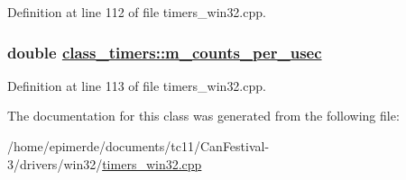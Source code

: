 Definition at line 112 of file timers\_\-win32.cpp.\hypertarget{classclass__timers_5bf844fdbe2e70ab6e3e832f688d382b}{
\subsubsection[m\_\-counts\_\-per\_\-usec]{\setlength{\rightskip}{0pt plus 5cm}double \hyperlink{classclass__timers_5bf844fdbe2e70ab6e3e832f688d382b}{class\_\-timers::m\_\-counts\_\-per\_\-usec}}}
\label{classclass__timers_5bf844fdbe2e70ab6e3e832f688d382b}




Definition at line 113 of file timers\_\-win32.cpp.

The documentation for this class was generated from the following file:\begin{CompactItemize}
\item 
/home/epimerde/documents/tc11/Can\-Festival-3/drivers/win32/\hyperlink{timers__win32_8cpp}{timers\_\-win32.cpp}\end{CompactItemize}

